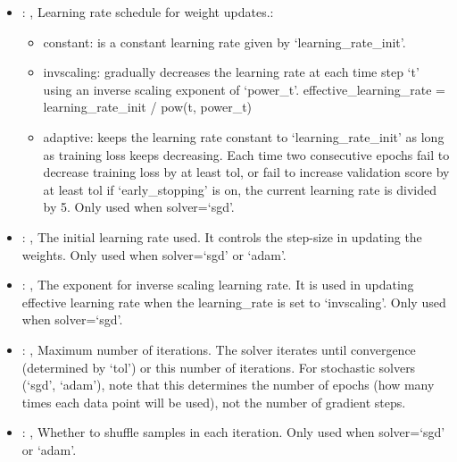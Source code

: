 \begin{itemize}
    \item {}: ,
      Learning rate schedule for weight updates.:
      \begin{itemize}                                                   \item constant: is a
      constant learning rate given by `learning\_rate\_init'.
      \item invscaling: gradually decreases the learning rate at each time step `t' using
      an inverse scaling exponent of `power\_t'. effective\_learning\_rate = learning\_rate\_init /
      pow(t, power\_t)                                                   \item adaptive: keeps the
      learning rate constant to `learning\_rate\_init' as long as training
      loss keeps decreasing. Each time two consecutive epochs fail to decrease training loss by at
      least tol, or fail to increase validation score by at least tol if `early\_stopping' is on,
      the current learning rate is divided by 5. Only used when solver=`sgd'.
      \end{itemize}

    \item {}: ,
      The initial learning rate used. It controls the step-size in updating the weights.
      Only used when solver=`sgd' or `adam'.

    \item {}: ,
      The exponent for inverse scaling learning rate. It is used in updating effective
      learning rate when the learning\_rate is set to `invscaling'. Only used when solver=`sgd'.

    \item {}: ,
      Maximum number of iterations. The solver iterates until convergence
      (determined by `tol') or this number of iterations. For stochastic solvers (`sgd', `adam'),
      note that this determines the number of epochs (how many times each data point will be used),
      not the number of gradient steps.

    \item {}: ,
      Whether to shuffle samples in each iteration. Only used when solver=`sgd' or `adam'.


\end{itemize}
